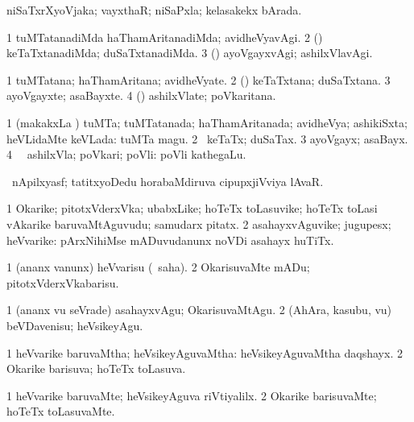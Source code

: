 \bentry
{}
\gl{\gu}
\bmng
niSaTxrXyoVjaka; vayxthaR; niSaPxla; kelasakekx bArada. 
\emng
\eentry

\bentry
{}
\gl{\kirxvi}
\bmng
\bnum
\num{1} tuMTatanadiMda haThamAritanadiMda; avidheVyavAgi. 
\num{2} (\pArxparx) keTaTxtanadiMda; duSaTxtanadiMda. 
\num{3} (\AmA) ayoVgayxvAgi; ashilxVlavAgi. 
\enum
\emng
\eentry

\bentry
{}
\gl{\nA}
\bmng
\bnum
\num{1} tuMTatana; haThamAritana; avidheVyate. 
\num{2} (\pArxparx) keTaTxtana; duSaTxtana. 
\num{3} ayoVgayxte; asaBayxte. 
\num{4} (\AmA) ashilxVlate; poVkaritana. 
\enum
\emng
\eentry

\bentry
{}
\gl{\gu}
\bmng
\bnum
\num{1} (makakxLa \vi) tuMTa; tuMTatanada; haThamAritanada; avidheVya; ashikiSxta; heVLidaMte keVLada:  tuMTa magu. 
\num{2} \pArxparx\ keTaTx; duSaTax. 
\num{3} ayoVgayx; asaBayx. 
\num{4} \AmA\ \hA\ ashilxVla; poVkari; poVli:  poVli kathegaLu. 
\enum
\emng
\eentry

\bentry
{}
\gl{\nA}
\bmng
\pArxvi\ nApilxyasf; tatitxyoDedu horabaMdiruva cipupxjiVviya lAvaR. 
\emng
\eentry

\bentry
{}
\gl{\nA}
\bmng
\bnum
\num{1} Okarike; pitotxVderxVka; ubabxLike; hoTeTx toLasuvike; hoTeTx toLasi vAkarike baruvaMtAguvudu; samudarx pitatx. 
\num{2} asahayxvAguvike; jugupesx; heVvarike:  pArxNihiMse mADuvudanunx noVDi asahayx huTiTx. 
\enum
\emng
\eentry

\bentry
{}
\gl{\sakirx}
\bmng
\bnum
\num{1} (ananx \mo vanunx) heVvarisu (\rUpa\ saha). 
\num{2} OkarisuvaMte mADu; pitotxVderxVkabarisu. 
\enum
\emng

\noindent
\gl{\akirx}
\bmng
\bnum
\num{1} (ananx \mo vu seVrade) asahayxvAgu; OkarisuvaMtAgu. 
\num{2} (AhAra, kasubu, \mo vu) beVDavenisu; heVsikeyAgu. 
\enum
\emng
\eentry

\bentry
{}
\gl{\gu}
\bmng
\bnum
\num{1} heVvarike baruvaMtha; heVsikeyAguvaMtha:  heVsikeyAguvaMtha daqshayx. 
\num{2} Okarike barisuva; hoTeTx toLasuva. 
\enum
\emng
\eentry

\bentry
{}
\gl{\kirxvi}
\bmng
\bnum
\num{1} heVvarike baruvaMte; heVsikeyAguva riVtiyalilx. 
\num{2} Okarike barisuvaMte; hoTeTx toLasuvaMte. 
\enum
\emng
\eentry


